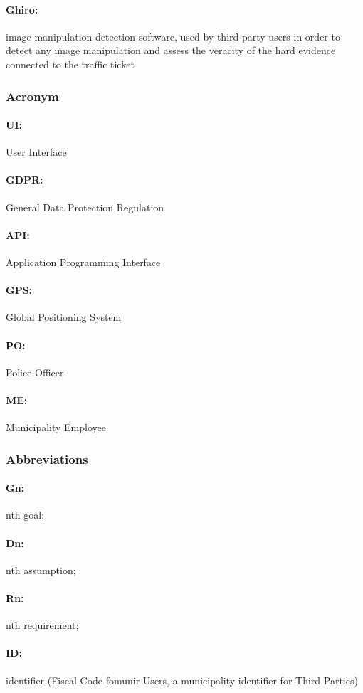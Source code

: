 \documentclass{article}
\begin{document}
\paragraph{Ghiro:} image manipulation detection software, used by third party
users in order to detect any image manipulation and assess the veracity of the
hard evidence connected to the traffic ticket
\subsubsection{Acronym}
\paragraph{UI:} User Interface \paragraph{GDPR:} General Data Protection
Regulation \paragraph{API:} Application Programming Interface \paragraph{GPS:}
Global Positioning System \paragraph{PO:} Police Officer \paragraph{ME:}
Municipality Employee
\subsubsection{Abbreviations}
\paragraph{Gn:} nth goal; \paragraph{Dn:} nth assumption; \paragraph{Rn:} nth
requirement; \paragraph{ID: } identifier (Fiscal Code fomunir Users, a municipality
identifier for Third Parties)
\end{document}
